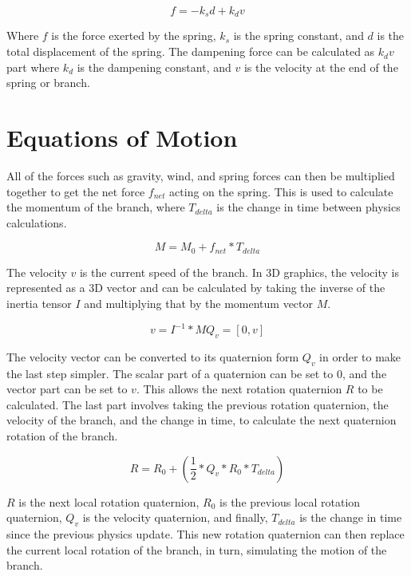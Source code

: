 \begin{equation}
f = -k _s d + k _d v
\end{equation}

\noindent
Where $f$ is the force exerted by the spring, $k _s$ is the spring constant, and $d$ is the total displacement of the spring. The dampening force can be calculated as $k _d v$ part where $k _d$ is the dampening constant, and $v$ is the velocity at the end of the spring or branch.


\section{Equations of Motion} \label{motion equations}

All of the forces such as gravity, wind, and spring forces can then be multiplied together to get the net force $f_{net}$ acting on the spring. This is used to calculate the momentum of the branch, where $T_{delta}$ is the change in time between physics calculations.

\begin{equation}
M = M_0 + f_{net} * T_{delta}
\end{equation}

\noindent
The velocity $v$ is the current speed of the branch. In 3D graphics, the velocity is represented as a 3D vector and can be calculated by taking the inverse of the inertia tensor $I$ and multiplying that by the momentum vector $M$.

\begin{equation}
v = I^{-1} * M
Q_v = [0, v]
\end{equation}

\noindent
The velocity vector can be converted to its quaternion form $Q_v$ in order to make the last step simpler. The scalar part of a quaternion can be set to 0, and the vector part can be set to $v$. This allows the next rotation quaternion $R$ to be calculated. The last part involves taking the previous rotation quaternion, the velocity of the branch, and the change in time, to calculate the next quaternion rotation of the branch.

\begin{equation}
R = R_0 + (\frac{1}{2} * Q_v * R_0 * T_{delta})
\end{equation}

\noindent
$R$ is the next local rotation quaternion, $R_0$ is the previous local rotation quaternion, $Q_v$ is the velocity quaternion, and finally, $T_{delta}$ is the change in time since the previous physics update. This new rotation quaternion can then replace the current local rotation of the branch, in turn, simulating the motion of the branch.

